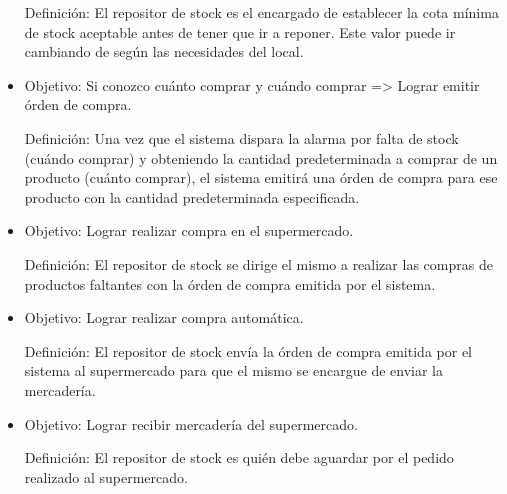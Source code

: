 \documentclass[a4paper,11pt] {article}
\begin{document}
\begin{itemize}
Definici\'on: El repositor de stock es el encargado de establecer la cota m\'inima de stock aceptable antes de tener que ir a reponer. Este valor puede ir cambiando de seg\'un las necesidades del local.

\item
Objetivo: Si conozco cu\'anto comprar y cu\'ando comprar => Lograr emitir \'orden de compra.

Definici\'on: Una vez que el sistema dispara la alarma por falta de stock (cu\'ando comprar) y obteniendo la cantidad predeterminada a comprar de un producto (cu\'anto comprar), el sistema emitir\'a una \'orden de compra para ese producto con la cantidad predeterminada especificada.

\item
Objetivo: Lograr realizar compra en el supermercado.

Definici\'on: El repositor de stock se dirige el mismo a realizar las compras de productos faltantes con la \'orden de compra emitida por el sistema.

\item
Objetivo: Lograr realizar compra autom\'atica.

Definici\'on: El repositor de stock env\'ia la \'orden de compra emitida por el sistema al supermercado para que el mismo se encargue de enviar la mercader\'ia.

\item
Objetivo: Lograr recibir mercader\'ia del supermercado.

Definici\'on: El repositor de stock es qui\'en debe aguardar por el pedido realizado al supermercado.

\end{itemize}
\end{document}
